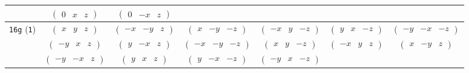\documentclass[fleqn,9pt,landscape]{jsarticle}
\begin{document}
\begin{center}
\begin{longtable}{ccccccc}
& $ \begin{pmatrix} 0 & x & z \end{pmatrix} $ & $ \begin{pmatrix} 0 & - x & z \end{pmatrix} $ & $  $ & $  $ & $  $ & $  $ \\ \hline
{\tt 16g} ({\tt 1}) & $ \begin{pmatrix} x & y & z \end{pmatrix} $ & $ \begin{pmatrix} - x & - y & z \end{pmatrix} $ & $ \begin{pmatrix} x & - y & - z \end{pmatrix} $ & $ \begin{pmatrix} - x & y & - z \end{pmatrix} $ & $ \begin{pmatrix} y & x & - z \end{pmatrix} $ & $ \begin{pmatrix} - y & - x & - z \end{pmatrix} $ \\
& $ \begin{pmatrix} - y & x & z \end{pmatrix} $ & $ \begin{pmatrix} y & - x & z \end{pmatrix} $ & $ \begin{pmatrix} - x & - y & - z \end{pmatrix} $ & $ \begin{pmatrix} x & y & - z \end{pmatrix} $ & $ \begin{pmatrix} - x & y & z \end{pmatrix} $ & $ \begin{pmatrix} x & - y & z \end{pmatrix} $ \\
& $ \begin{pmatrix} - y & - x & z \end{pmatrix} $ & $ \begin{pmatrix} y & x & z \end{pmatrix} $ & $ \begin{pmatrix} y & - x & - z \end{pmatrix} $ & $ \begin{pmatrix} - y & x & - z \end{pmatrix} $ & $  $ & $  $ \\
\end{longtable}
\end{center}
\end{document}
